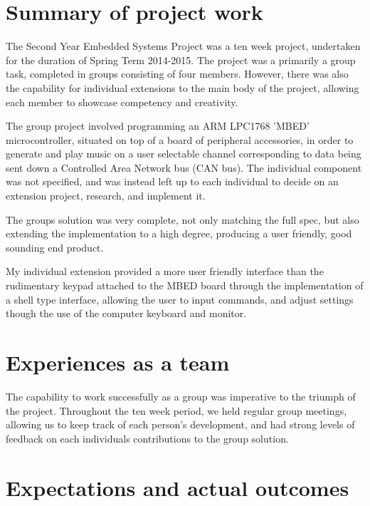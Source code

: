 \section{Summary of project work}
The Second Year Embedded Systems Project was a ten week project, undertaken 
for the duration of Spring Term 2014-2015. The project was a primarily a 
group task, completed in groups consisting of four members. However, there 
was also the capability for individual extensions to the main body of the 
project, allowing each member to showcase competency and creativity.

The group project involved programming an ARM LPC1768 'MBED' microcontroller, 
situated on top of a board of peripheral accessories, in order to 
generate and play music on a user selectable channel corresponding to data 
being sent down a Controlled Area Network bus (CAN bus). The individual 
component was not specified, and was instead left up to each individual to 
decide on an extension project, research, and implement it. 

The groups solution was very complete, not only matching the full spec, but also
extending the implementation to a high degree, producing a user friendly, good 
sounding end product. 

My individual extension provided a more user friendly interface than the 
rudimentary keypad attached to the MBED board through the implementation of a 
shell type interface, allowing the user to input commands, and adjust settings
though the use of the computer keyboard and monitor. 
 
\section{Experiences as a team}
The capability to work successfully as a group was imperative to the triumph of
the project. Throughout the ten week period, we held regular group meetings, 
allowing us to keep track of each person's development, and had strong levels 
of feedback on each individuals contributions to the group solution.
\section{Expectations and actual outcomes}
